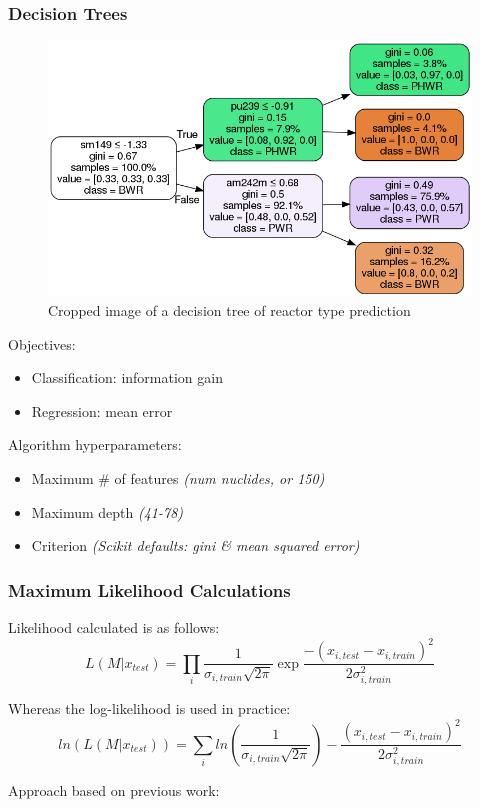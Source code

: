 \begin{frame}
  \frametitle{Decision Trees}
  \begin{adjustwidth}{-15pt}{0pt}
  \begin{minipage}{0.63\textwidth}
    \begin{figure}
      \centering
      \includegraphics[width=\textwidth]{./figures/dtree.png}
      \caption{Cropped image of a decision tree of reactor type prediction}
    \end{figure}
  \end{minipage}%
  \hfill
  \begin{minipage}{0.4\textwidth}
    Objectives: %
    \begin{itemize}
      \item Classification: information gain
      \item Regression: mean error
    \end{itemize}
    Algorithm hyperparameters:
    \begin{itemize}
      \item Maximum \# of features \textit{(num nuclides, or 150)}
      \item Maximum depth \textit{(41-78)}
      \item Criterion \textit{(Scikit defaults: gini \& mean squared error)}
    \end{itemize}
  \end{minipage}
  \end{adjustwidth}
\end{frame}

\begin{frame}
  \frametitle{Maximum Likelihood Calculations}

Likelihood calculated is as follows:
\[
  L(M|x_{test}) = \prod_i \frac{1}{\sigma_{i,train} \sqrt{2\pi}} \exp{\frac{-(x_{i,test} - x_{i,train})^2}{2 \sigma_{i,train}^2}}
\]

Whereas the log-likelihood is used in practice:
\[
  ln(L(M|x_{test})) = \sum_i ln(\frac{1}{\sigma_{i,train} \sqrt{2\pi}}) - \frac{(x_{i,test} - x_{i,train})^2}{2 \sigma_{i,train}^2}
\]

Approach based on previous work: \cite{mll_method} \\~\\

\end{frame}
